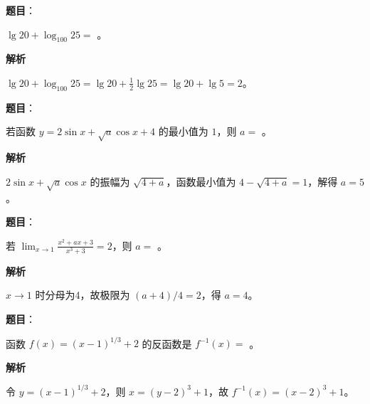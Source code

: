 

\begin{answer}

\textbf{题目}：

$\lg 20+\log_{100}25=$ \gkblank{}。

\textbf{解析}

$\lg20+\log_{100}25=\lg20+\frac12\lg25=\lg20+\lg5=2$。


\end{answer}
\begin{answer}

\textbf{题目}：

若函数 $y=2\sin x+\sqrt a\cos x+4$ 的最小值为 $1$，则 $a=$ \gkblank{}。

\textbf{解析}

$2\sin x+\sqrt a\cos x$ 的振幅为 $\sqrt{4+a}$，函数最小值为 $4-\sqrt{4+a}=1$，解得 $a=5$。


\end{answer}
\begin{answer}

\textbf{题目}：

若 $\displaystyle\lim_{x\to1}\frac{x^2+ax+3}{x^3+3}=2$，则 $a=$ \gkblank{}。

\textbf{解析}

$x\to1$ 时分母为4，故极限为 $(a+4)/4=2$，得 $a=4$。


\end{answer}
\begin{answer}

\textbf{题目}：

函数 $f(x)=(x-1)^{1/3}+2$ 的反函数是 $f^{-1}(x)=$ \gkblank{}。

\textbf{解析}

令 $y=(x-1)^{1/3}+2$，则 $x=(y-2)^3+1$，故 $f^{-1}(x)=(x-2)^3+1$。


\end{answer}
